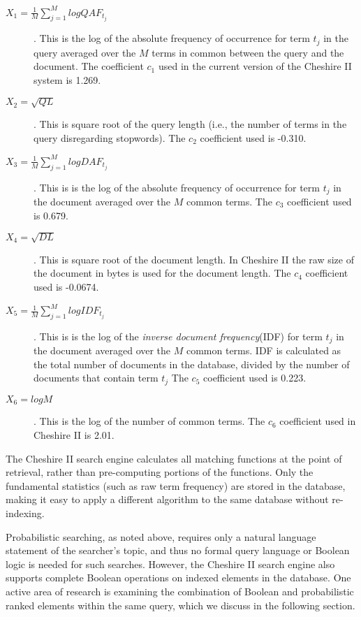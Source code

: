 \begin{description}
\item [$X_{1} = \frac{1}{M}\sum_{j=1}^{M} log QAF_{t_{j}}$]. This 
is the log of the absolute frequency of occurrence for term $t_{j}$ 
in the query averaged over the $M$ terms in common between the query and the
document. The coefficient $c_1$ used in the current version of the
Cheshire II system is 1.269.
\item [$X_{2} = \sqrt{QL}$]. This is square root of the query length
(i.e., the number of terms in the query disregarding stopwords). The
$c_2$ coefficient used is -0.310.
\item [$X_{3} = \frac{1}{M}\sum_{j=1}^{M} log DAF_{t_{j}}$]. This is 
is the log of the absolute frequency of occurrence for term $t_{j}$ 
in the document averaged over the $M$ common terms. The 
$c_3$ coefficient used is 0.679.
\item [$X_{4} = \sqrt{DL}$]. This is square root of the document length.
In Cheshire II the raw size of the document in bytes is used for the
document length. The $c_4$ coefficient used is -0.0674.
\item [$X_{5} = \frac{1}{M}\sum_{j=1}^{M} log IDF_{t_{j}}$]. This is 
is the log of the {\em inverse document frequency}(IDF) for term $t_{j}$ 
in the document averaged over the $M$ common terms. 
IDF is calculated as the total number of documents in the database,
divided by the number of documents that contain term $t_{j}$
The $c_5$ coefficient used is 0.223.
\item [$X_{6} = log M$]. This is the log of the number of common terms.
The $c_6$ coefficient used in Cheshire II is 2.01.

\end{description}

The Cheshire II search engine calculates
all matching functions at the point of retrieval, rather than 
pre-computing portions of the functions. Only the fundamental statistics
(such as raw term frequency) are stored in the database, making it easy
to apply a different algorithm to the same database without re-indexing.

Probabilistic searching, as noted above, requires only a natural language
statement of the searcher's topic, and thus no formal query language
or Boolean logic is needed for such searches. However, the Cheshire II
search engine also supports complete Boolean operations on indexed
elements in the database. One active area of research is examining
the combination of Boolean and probabilistic ranked elements within
the same query, which we discuss in the following section.

